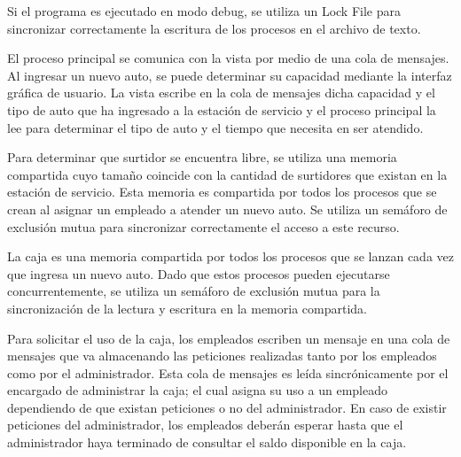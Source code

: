 \documentclass[12pt,a4paper,titlepage,oneside]{article}
\renewenvironment{itemize}{
 \begin{list}{}{
  \setlength{\leftmargin}{1.5em}
 }
}{
 \end{list}
}
\begin{document}
\begin{enumerate}
\begin{itemize}
\item[•] Si el programa es ejecutado en modo debug, se utiliza un Lock File para sincronizar correctamente la escritura de los procesos en el archivo de texto.
\item[•] El proceso principal se comunica con la vista por medio de una cola de mensajes. Al ingresar un nuevo auto, se puede determinar su capacidad mediante la interfaz gráfica de usuario. La vista escribe en la cola de mensajes dicha capacidad y el tipo de auto que ha ingresado a la estación de servicio y el proceso principal la lee para determinar el tipo de auto y el tiempo que necesita en ser atendido.
\item[•] Para determinar que surtidor se encuentra libre, se utiliza una memoria compartida cuyo tamaño coincide con la cantidad de surtidores que existan en la estación de servicio. Esta memoria es compartida por todos los procesos que se crean al asignar un empleado a atender un nuevo auto. Se utiliza un semáforo de exclusión mutua para sincronizar correctamente el acceso a este recurso.
\item[•] La caja es una memoria compartida por todos los procesos que se lanzan cada vez que ingresa un nuevo auto. Dado que estos procesos pueden ejecutarse concurrentemente, se utiliza un semáforo de exclusión mutua para la sincronización de la lectura y escritura en la memoria compartida.
\item[•] Para solicitar el uso de la caja, los empleados escriben un mensaje en una cola de mensajes que va almacenando las peticiones realizadas tanto por los empleados como por el administrador. Esta cola de mensajes es leída sincrónicamente por el encargado de administrar la caja; el cual asigna su uso a un empleado dependiendo de que existan peticiones o no del administrador. En caso de existir peticiones del administrador, los empleados deberán esperar hasta que el administrador haya terminado de consultar el saldo disponible en la caja.
\end{itemize}
\end{enumerate}
\end{document}
